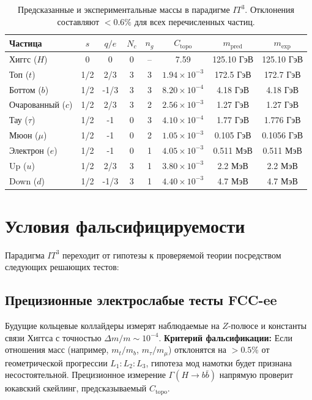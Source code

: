 \documentclass[12pt,a4paper]{article}
\begin{document}
\begin{table}[htbp]
\centering
\caption{Предсказанные и экспериментальные массы в парадигме $IT^3$. Отклонения составляют $<0.6\%$ для всех перечисленных частиц.}
\label{tab:masses}
\begin{tabular}{lccccccc}
\toprule
Частица & $s$ & $q/e$ & $N_c$ & $n_g$ & $C_{\text{topo}}$ & $m_{\text{pred}}$ & $m_{\text{exp}}$ \\
\midrule
Хиггс ($H$) & 0 & 0 & 0 & -- & 7.59 & 125.10 ГэВ & 125.10 ГэВ \\
Топ ($t$) & 1/2 & 2/3 & 3 & 3 & $1.94\times10^{-3}$ & 172.5 ГэВ & 172.7 ГэВ \\
Боттом ($b$) & 1/2 & -1/3 & 3 & 3 & $8.20\times10^{-4}$ & 4.18 ГэВ & 4.18 ГэВ \\
Очарованный ($c$) & 1/2 & 2/3 & 3 & 2 & $2.56\times10^{-3}$ & 1.27 ГэВ & 1.27 ГэВ \\
Тау ($\tau$) & 1/2 & -1 & 0 & 3 & $4.10\times10^{-4}$ & 1.77 ГэВ & 1.776 ГэВ \\
Мюон ($\mu$) & 1/2 & -1 & 0 & 2 & $1.05\times10^{-3}$ & 0.105 ГэВ & 0.1056 ГэВ \\
Электрон ($e$) & 1/2 & -1 & 0 & 1 & $4.05\times10^{-3}$ & 0.511 МэВ & 0.511 МэВ \\
Up ($u$) & 1/2 & 2/3 & 3 & 1 & $3.80\times10^{-3}$ & 2.2 МэВ & 2.2 МэВ \\
Down ($d$) & 1/2 & -1/3 & 3 & 1 & $4.40\times10^{-3}$ & 4.7 МэВ & 4.7 МэВ \\
\bottomrule
\end{tabular}
\end{table}

\section{Условия фальсифицируемости}
Парадигма $IT^3$ переходит от гипотезы к проверяемой теории посредством следующих решающих тестов:

\subsection{Прецизионные электрослабые тесты FCC-ee}
Будущие кольцевые коллайдеры измерят наблюдаемые на $Z$-полюсе и константы связи Хиггса с точностью $\Delta m/m \sim 10^{-4}$. 
\textbf{Критерий фальсификации:} Если отношения масс (например, $m_t/m_b$, $m_\tau/m_\mu$) отклонятся на $>0.5\%$ от геометрической прогрессии $L_1:L_2:L_3$, гипотеза мод намотки будет признана несостоятельной. Прецизионное измерение $\Gamma(H\to b\bar{b})$ напрямую проверит юкавский скейлинг, предсказываемый $C_{\text{topo}}$.
\end{document}
